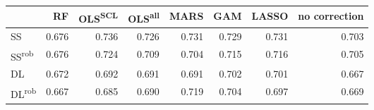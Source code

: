 \begin{tabular}{lrrrrrrr}
\toprule
 & RF & OLS\textsuperscript{SCL} & OLS\textsuperscript{all} & MARS & GAM & LASSO & no correction \\
\midrule
SS & {\cellcolor[HTML]{D1D1D1}} \color[HTML]{000000} 0.676 & {\cellcolor[HTML]{000000}} \color[HTML]{F1F1F1} 0.736 & {\cellcolor[HTML]{232323}} \color[HTML]{F1F1F1} 0.726 & {\cellcolor[HTML]{111111}} \color[HTML]{F1F1F1} 0.731 & {\cellcolor[HTML]{181818}} \color[HTML]{F1F1F1} 0.729 & {\cellcolor[HTML]{111111}} \color[HTML]{F1F1F1} 0.731 & {\cellcolor[HTML]{737373}} \color[HTML]{F1F1F1} 0.703 \\
SS\textsuperscript{rob} & {\cellcolor[HTML]{D1D1D1}} \color[HTML]{000000} 0.676 & {\cellcolor[HTML]{2A2A2A}} \color[HTML]{F1F1F1} 0.724 & {\cellcolor[HTML]{5E5E5E}} \color[HTML]{F1F1F1} 0.709 & {\cellcolor[HTML]{6F6F6F}} \color[HTML]{F1F1F1} 0.704 & {\cellcolor[HTML]{494949}} \color[HTML]{F1F1F1} 0.715 & {\cellcolor[HTML]{464646}} \color[HTML]{F1F1F1} 0.716 & {\cellcolor[HTML]{6C6D6C}} \color[HTML]{F1F1F1} 0.705 \\
DL & {\cellcolor[HTML]{E0E0E0}} \color[HTML]{000000} 0.672 & {\cellcolor[HTML]{9A9A9A}} \color[HTML]{F1F1F1} 0.692 & {\cellcolor[HTML]{9D9D9D}} \color[HTML]{F1F1F1} 0.691 & {\cellcolor[HTML]{9D9D9D}} \color[HTML]{F1F1F1} 0.691 & {\cellcolor[HTML]{777777}} \color[HTML]{F1F1F1} 0.702 & {\cellcolor[HTML]{7A7A7A}} \color[HTML]{F1F1F1} 0.701 & {\cellcolor[HTML]{F1F1F1}} \color[HTML]{000000} 0.667 \\
DL\textsuperscript{rob} & {\cellcolor[HTML]{F1F1F1}} \color[HTML]{000000} 0.667 & {\cellcolor[HTML]{B2B2B2}} \color[HTML]{000000} 0.685 & {\cellcolor[HTML]{A0A0A0}} \color[HTML]{F1F1F1} 0.690 & {\cellcolor[HTML]{3B3B3B}} \color[HTML]{F1F1F1} 0.719 & {\cellcolor[HTML]{6F6F6F}} \color[HTML]{F1F1F1} 0.704 & {\cellcolor[HTML]{888888}} \color[HTML]{F1F1F1} 0.697 & {\cellcolor[HTML]{EAEAEA}} \color[HTML]{000000} 0.669 \\
\bottomrule
\end{tabular}

